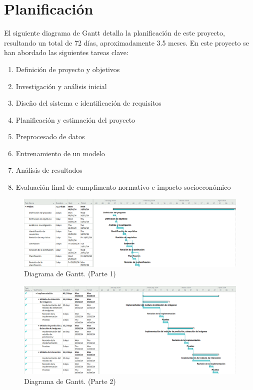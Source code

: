 \documentclass[12pt]{report} %
\begin{document}
\section{Planificación}

El siguiente diagrama de Gantt detalla la planificación de este proyecto, resultando un total de 72 días, aproximadamente 3.5 meses. En este proyecto se han abordado las siguientes tareas clave:

\begin{enumerate}

    \item Definición de proyecto y objetivos
    \item Investigación y análisis inicial
    \item Diseño del sistema e identificación de requisitos
    \item Planificación y estimación del proyecto
    \item Preprocesado de datos
    \item Entrenamiento de un modelo
    \item Análisis de resultados
    \item Evaluación final de cumplimento normativo e impacto socioeconómico

\end{enumerate}

\begin{figure}[H]
	\centering
	\includegraphics[width=\textwidth]{gantt1.png}
	\caption{Diagrama de Gantt. (Parte 1)}
	\label{fig:imagen36}
\end{figure}

\begin{figure}[H]
	\centering
	\includegraphics[width=\textwidth]{gantt2.png}
	\caption{Diagrama de Gantt. (Parte 2)}
	\label{fig:imagen37}
\end{figure}
\end{document}
